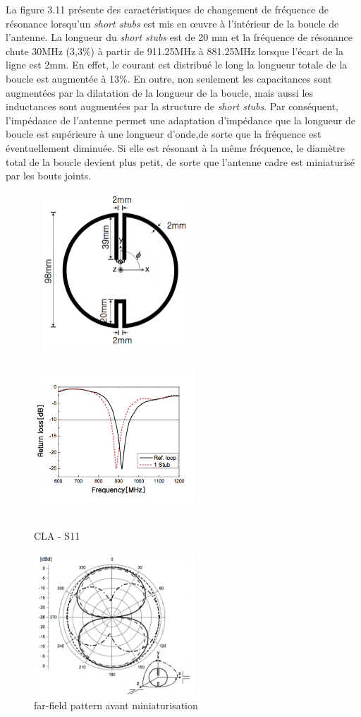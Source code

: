 \documentclass[11pt, a4paper, twoside]{book}
\begin{document}
La figure 3.11 présente des caractéristiques de changement de fréquence de résonance lorsqu'un \emph{short stubs} est mis en œuvre à l'intérieur de la boucle de l'antenne. La longueur du  \emph{short stubs} est de 20 mm et la fréquence de résonance chute 30MHz (3,3\%) à partir de 911.25MHz à 881.25MHz lorsque l'écart de la ligne est 2mm. En effet, le courant est distribué le long la longueur totale de la boucle est augmentée à 13\%. En outre, non seulement les capacitances sont augmentées par la dilatation de la longueur de la boucle, mais aussi les inductances sont augmentées par la structure de \emph{short stubs}. Par conséquent, l'impédance de l'antenne permet une adaptation d'impédance que la longueur de boucle est supérieure à une longueur d'onde,de sorte que la fréquence est éventuellement diminuée. Si elle est résonant à la même fréquence, le diamètre total de la boucle devient plus petit, de sorte que l'antenne cadre est miniaturisé par les bouts joints.


\begin{figure}[H]
\centering
\includegraphics[width=6cm, height=6cm]{stuba}
\includegraphics[width=6cm, height=6cm]{stubb}
\caption{CLA - S11}
\end{figure}

\begin{figure}[H]
\centering
\includegraphics[width=6cm]{lob}
\caption{far-field pattern avant miniaturisation}
\end{figure}
\end{document}
